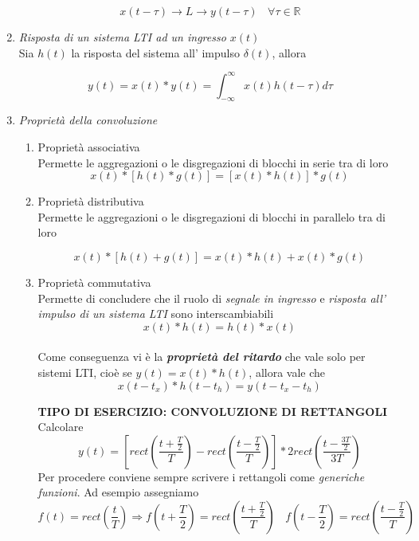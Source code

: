 \documentclass[]{article}
\newcommand{\numberset}{\mathbb}
\newcommand{\R}{\numberset{R}}
\begin{document}
\begin{enumerate}
\begin{equation}
x(t- \tau) \to L \to y(t- \tau) \ \ \ \ \forall \tau \in \R
\end{equation}

\item \textit{Risposta di un sistema LTI ad un ingresso $x(t)$}
\\
Sia $h(t)$ la risposta del sistema all' impulso $\delta(t)$, allora 

\begin{equation}
y(t) = x(t)*y(t) = \int_{- \infty}^{\infty} x(t) h(t- \tau) d \tau
\end{equation}

\item \textit{Proprietà della convoluzione}
\begin{enumerate}
\item Proprietà associativa
\\
Permette le aggregazioni o le disgregazioni di blocchi in serie tra di loro
\begin{equation}
x(t)*[h(t)*g(t)]=[x(t)*h(t)]*g(t)
\end{equation}

\item Proprietà distributiva
\\
Permette le aggregazioni o le disgregazioni di blocchi in parallelo tra di loro

\begin{equation}
x(t)*[h(t)+g(t)]=x(t)*h(t)+x(t)*g(t)
\end{equation}

\item Proprietà commutativa
\\
Permette di concludere che il ruolo di \textit{segnale in ingresso } e \textit{risposta all' impulso di un sistema LTI} sono interscambiabili
\begin{equation}
x(t)*h(t)=h(t)*x(t)
\end{equation}
\\
Come conseguenza vi è la \textbf{\textit{proprietà del ritardo}} che vale solo per sistemi LTI, cioè se $y(t)=x(t)*h(t)$, allora vale che
\begin{equation}
x(t-t_x)*h(t-t_h)= y(t-t_x-t_h)
\end{equation}

 \textbf{TIPO DI ESERCIZIO: CONVOLUZIONE DI RETTANGOLI} \\
Calcolare
\[ y(t)=\left[ rect \left( \frac{t+ \frac{T}{2}}{T} \right) -rect \left( \frac{t- \frac{T}{2}}{T}\right) \right] * 2rect \left( \frac{t- \frac{3T}{2}}{3T}\right) \]
Per procedere conviene sempre scrivere i rettangoli come \textit{generiche funzioni}. Ad esempio assegniamo
\[ f(t)= rect \left( \frac{t}{T} \right) \Rightarrow f \left( t+ \frac{T}{2}\right)= rect \left( \frac{t+ \frac{T}{2}}{T} \right) \ \ \ \  f \left( t- \frac{T}{2}\right)= rect \left( \frac{t- \frac{T}{2}}{T}\right) \]


\end{enumerate}
\end{enumerate}
\end{document}
